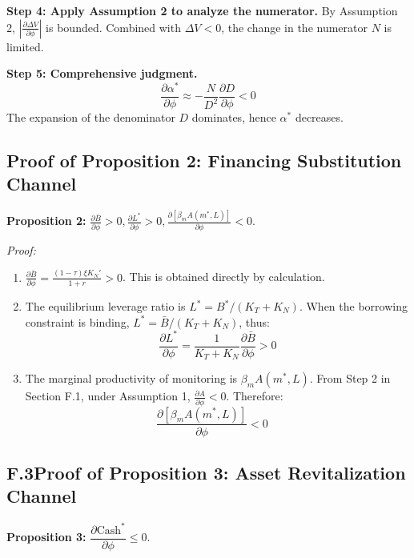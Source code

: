 \documentclass[12pt,a4paper]{article}
\begin{document}
\textbf{Step 4: Apply Assumption 2 to analyze the numerator.}
By Assumption 2, $\left| \frac{\partial \Delta V}{\partial \phi} \right|$ is bounded. Combined with $\Delta V < 0$, the change in the numerator $N$ is limited.

\textbf{Step 5: Comprehensive judgment.}
\begin{equation}
\frac{\partial \alpha^*}{\partial \phi} \approx -\frac{N}{D^2} \frac{\partial D}{\partial \phi} < 0
\end{equation}
The expansion of the denominator $D$ dominates, hence $\alpha^*$ decreases. 

\subsection{Proof of Proposition 2: Financing Substitution Channel}
\textbf{Proposition 2:} $\frac{\partial \bar{B}}{\partial \phi} > 0, \frac{\partial L^*}{\partial \phi} > 0, \frac{\partial [\beta_m A(m^*, L)]}{\partial \phi} < 0$.

\textit{Proof:}
\begin{enumerate}
    \item[(a)] $\frac{\partial \bar{B}}{\partial \phi} = \frac{(1-\tau) \xi K_N'}{1+r} > 0$. This is obtained directly by calculation.
    \item[(b)] The equilibrium leverage ratio is $L^* = B^* / (K_T + K_N)$. When the borrowing constraint is binding, $L^* = \bar{B} / (K_T + K_N)$, thus:
    \begin{equation}
    \frac{\partial L^*}{\partial \phi} = \frac{1}{K_T + K_N} \frac{\partial \bar{B}}{\partial \phi} > 0
    \end{equation}
    \item[(c)] The marginal productivity of monitoring is $\beta_m A(m^*, L)$. From Step 2 in Section F.1, under Assumption 1, $\frac{\partial A}{\partial \phi} < 0$. Therefore:
    \begin{equation}
    \frac{\partial [\beta_m A(m^*, L)]}{\partial \phi} < 0 \quad 
    \end{equation}
\end{enumerate}

\subsection*{F.3\quad Proof of Proposition 3: Asset Revitalization Channel}

\textbf{Proposition 3:} $\dfrac{\partial \text{Cash}^{*}}{\partial\phi}\leq 0$.
\end{document}
